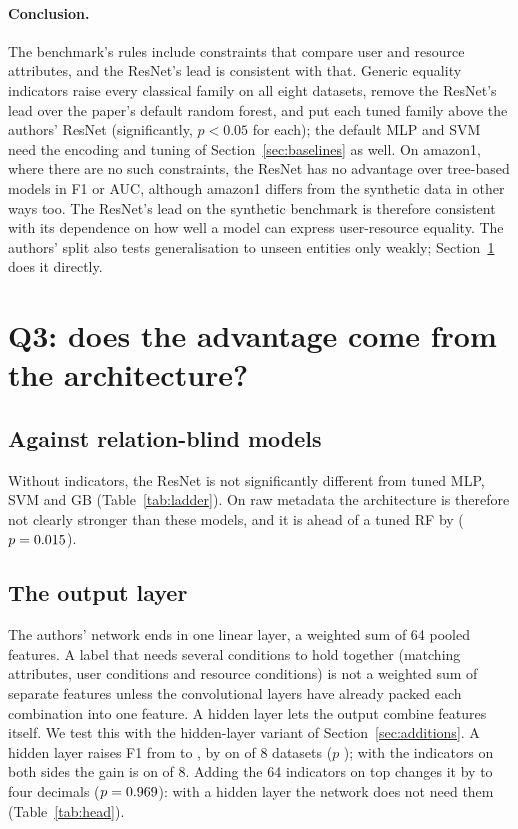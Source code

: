 \documentclass[11pt,a4paper]{article}
\begin{document}
\paragraph{Conclusion.} The benchmark's rules include constraints that compare user and resource attributes, and the ResNet's lead is consistent with that. Generic equality indicators raise every classical family on all eight datasets, remove the ResNet's lead over the paper's default random forest, and put each tuned family above the authors' ResNet (significantly, $p<0.05$ for each); the default MLP and SVM need the encoding and tuning of Section~\ref{sec:baselines} as well. On amazon1, where there are no such constraints, the ResNet has no advantage over tree-based models in F1 or AUC, although amazon1 differs from the synthetic data in other ways too. The ResNet's lead on the synthetic benchmark is therefore consistent with its dependence on how well a model can express user-resource equality. The authors' split also tests generalisation to unseen entities only weakly; Section~\ref{sec:arch} does it directly.

\section{Q3: does the advantage come from the architecture?}\label{sec:arch}

\subsection{Against relation-blind models}
Without indicators, the ResNet is not significantly different from tuned MLP, SVM and GB (Table~\ref{tab:ladder}). On raw metadata the architecture is therefore not clearly stronger than these models, and it is ahead of a tuned RF by \dRfTuned{} ($p=0.015$).

\subsection{The output layer}
The authors' network ends in one linear layer, a weighted sum of 64 pooled features. A label that needs several conditions to hold together (matching attributes, user conditions and resource conditions) is not a weighted sum of separate features unless the convolutional layers have already packed each combination into one feature. A hidden layer lets the output combine features itself. We test this with the hidden-layer variant of Section~\ref{sec:additions}. A hidden layer raises F1 from \fResnet{} to \fResnetHead{}, by \vHeadVsResnet{} on \vwHeadVsResnet{} of 8 datasets ($p$ \vpHeadVsResnet); with the indicators on both sides the gain is \vHeadEqVsEq{} on \vwHeadEqVsEq{} of 8. Adding the 64 indicators on top changes it by \vIndicatorsOnHeadU{} to four decimals ($p=0.969$): with a hidden layer the network does not need them (Table~\ref{tab:head}).
\end{document}
